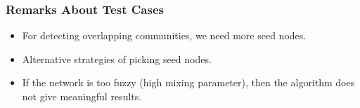 \documentclass[xcolor=table]{beamer}
\begin{document}
\begin{frame}[t]
\frametitle{Remarks About Test Cases}
\begin{itemize}
    \item For detecting overlapping communities, we need more seed nodes.
	\item Alternative strategies of picking seed nodes. 
    \item If the network is too fuzzy (high mixing parameter), then 
        the algorithm does not give meaningful results.
\end{itemize}
\end{frame}
\end{document}
